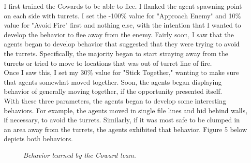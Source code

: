 \documentclass{article} %
\begin{document}
I first trained the Cowards to be able to flee. I flanked the agent spawning point on each side with turrets. I set the -100\% value for "Approach Enemy" and 10\% value for "Avoid Fire" first and nothing else, with the intention that I wanted to develop the behavior to flee away from the enemy. Fairly soon, I saw that the agents began to develop behavior that suggested that they were trying to avoid the turrets. Specifically, the majority began to start straying away from the turrets or tried to move to locations that was out of turret line of fire. 
\\[1\baselineskip]
Once I saw this, I set my 30\% value for "Stick Together," wanting to make sure that agents somewhat moved together. Soon, the agents began displaying behavior of generally moving together, if the opportunity presented itself.
\\[1\baselineskip]
With these three parameters, the agents began to develop some interesting behaviors. For example, the agents moved in single file lines and hid behind walls, if necessary, to avoid the turrets. Similarly, if it was most safe to be clumped in an area away from the turrets, the agents exhibited that behavior. Figure 5 below depicts both behaviors.

\begin{figure}[H]%
	\centering
    	\hfill%
		\hfill%
    \caption{\textit{Behavior learned by the Coward team.}}
    \label{fig:default}
\end{figure} 
\end{document}

